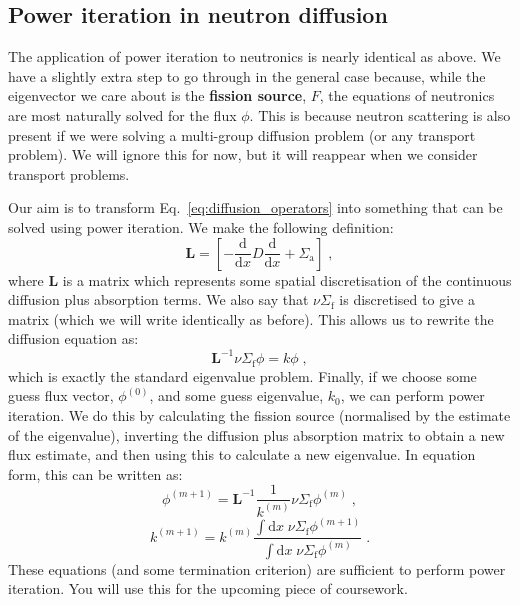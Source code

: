 \documentclass{article}
\begin{document}
\subsection{Power iteration in neutron diffusion}

The application of power iteration to neutronics is nearly identical as above. We have a slightly extra step to go through in the general case because, while the eigenvector we care about is the \textbf{fission source}, $F$, the equations of neutronics are most naturally solved for the flux $\phi$. This is because neutron scattering is also present if we were solving a multi-group diffusion problem (or any transport problem). We will ignore this for now, but it will reappear when we consider transport problems.

Our aim is to transform Eq.~\eqref{eq:diffusion_operators} into  something that can be solved using power iteration. We make the following definition:
\begin{equation}
    \mathbf{L} = \left[-\frac{\mathrm{d}}{\mathrm{d}x}D\frac{\mathrm{d}}{\mathrm{d}x} + \Sigma_\mathrm{a}\right]\;\mathrm{,}
\end{equation}
where $\mathbf{L}$ is a matrix which represents some spatial discretisation of the continuous diffusion plus absorption terms. We also say that $\nu\Sigma_\mathrm{f}$ is discretised to give a matrix (which we will write identically as before). This allows us to rewrite the diffusion equation as:
\begin{equation}
    \mathbf{L}^{-1}\nu\Sigma_\mathrm{f}\phi = k\phi\;\mathrm{,}
\end{equation}
which is exactly the standard eigenvalue problem. Finally, if we choose some guess flux vector, $\phi^{(0)}$, and some guess eigenvalue, $k_0$, we can perform power iteration. We do this by calculating the fission source (normalised by the estimate of the eigenvalue), inverting the diffusion plus absorption matrix to obtain a new flux estimate, and then using this to calculate a new eigenvalue. In equation form, this can be written as:
\begin{equation}
    \phi^{(m+1)}=\mathbf{L}^{-1}\frac{1}{k^{(m)}}\nu\Sigma_\mathrm{f}\phi^{(m)}\;\mathrm{,}
\end{equation}
\begin{equation}
    k^{(m+1)} = k^{(m)} \frac{\int \mathrm{d}x\; \nu\Sigma_\mathrm{f}\phi^{(m+1)}}{\int \mathrm{d}x\; \nu\Sigma_\mathrm{f}\phi^{(m)}}\;\mathrm{.}
\end{equation}
These equations (and some termination criterion) are sufficient to perform power iteration. You will use this for the upcoming piece of coursework.
\end{document}

